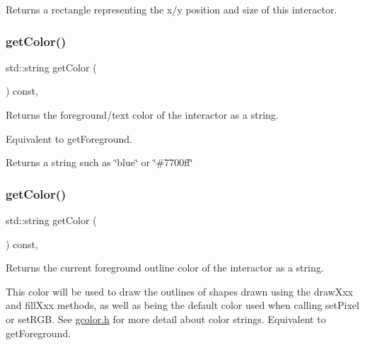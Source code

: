 Returns a rectangle representing the x/y position and size of this interactor. 

\mbox{\label{classGInteractor_aa061dfa488c31e18549d64363c1d0e34}} 
\subsubsection{\texorpdfstring{get\+Color()}{getColor()}\hspace{0.1cm}{\footnotesize\ttfamily [1/2]}}
{\footnotesize\ttfamily std\+::string get\+Color (\begin{DoxyParamCaption}{ }\end{DoxyParamCaption}) const\hspace{0.3cm}{\ttfamily [virtual]}, {\ttfamily [inherited]}}



Returns the foreground/text color of the interactor as a string. 

Equivalent to get\+Foreground. \begin{DoxyReturn}{Returns}
a string such as \char`\"{}blue\char`\"{} or \char`\"{}\#7700ff\char`\"{} 
\end{DoxyReturn}
\mbox{\label{classGDrawingSurface_aa061dfa488c31e18549d64363c1d0e34}} 
\subsubsection{\texorpdfstring{get\+Color()}{getColor()}\hspace{0.1cm}{\footnotesize\ttfamily [2/2]}}
{\footnotesize\ttfamily std\+::string get\+Color (\begin{DoxyParamCaption}{ }\end{DoxyParamCaption}) const\hspace{0.3cm}{\ttfamily [virtual]}, {\ttfamily [inherited]}}



Returns the current foreground outline color of the interactor as a string. 

This color will be used to draw the outlines of shapes drawn using the draw\+Xxx and fill\+Xxx methods, as well as being the default color used when calling set\+Pixel or set\+R\+GB. See \mbox{\hyperlink{gcolor_8h_source}{gcolor.\+h}} for more detail about color strings. Equivalent to get\+Foreground. \mbox{\label{classGInteractor_a9635c7af766cdc3417f346683fa0e6c1}} 
